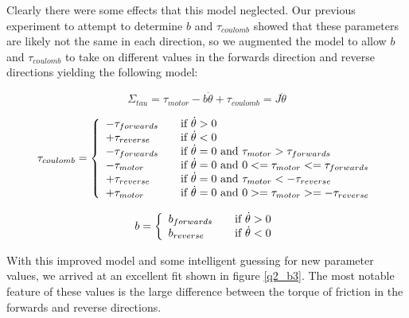 \documentclass{article}
\theoremstyle{plain}
\theoremstyle{definition}
\theoremstyle{remark}
\begin{document}
Clearly there were some effects that this model neglected.  Our previous experiment to attempt to determine $b$ and $\tau_{coulomb}$ showed that these parameters are likely not the same in each direction, so we augmented the model to allow $b$ and $\tau_{coulomb}$ to take on different values in the forwards direction and reverse directions yielding the following model:

$$ \Sigma_{tau} = \tau_{motor} - b\dot{\theta} + \tau_{coulomb} = J \ddot{\theta} $$

\[
  \tau_{coulomb} = \left\{
  \begin{array}{l l}
    	- \tau_{forwards} & \quad \text{if } \dot{\theta} > 0 \\
    	+ \tau_{reverse} & \quad \text{if } \dot{\theta} < 0 \\
	- \tau_{forwards} & \quad \text{if } \dot{\theta} = 0 \text{ and } \tau_{motor} > \tau_{forwards} \\
	- \tau_{motor} & \quad \text{if } \dot{\theta} = 0 \text{ and } 0 <= \tau_{motor} <= \tau_{forwards} \\
	+ \tau_{reverse} & \quad \text{if } \dot{\theta} = 0 \text{ and } \tau_{motor} < -\tau_{reverse} \\
	+ \tau_{motor} & \quad \text{if } \dot{\theta} = 0 \text{ and } 0 >=\tau_{motor} >= -\tau_{reverse}\\
  \end{array} \right.
\]

\[
b = \left\{
\begin{array}{l l}
b_{forwards} & \quad \text{if } \dot{\theta} > 0 \\
b_{reverse} & \quad  \text{if } \dot{\theta} < 0 \\
\end{array} \right.
\]

With this improved model and some intelligent guessing for new parameter values, we arrived at an excellent fit shown in figure \ref{q2_b3}. The most notable feature of these values is the large difference between the torque of friction in the forwards and reverse directions. \\ 
\end{document}
